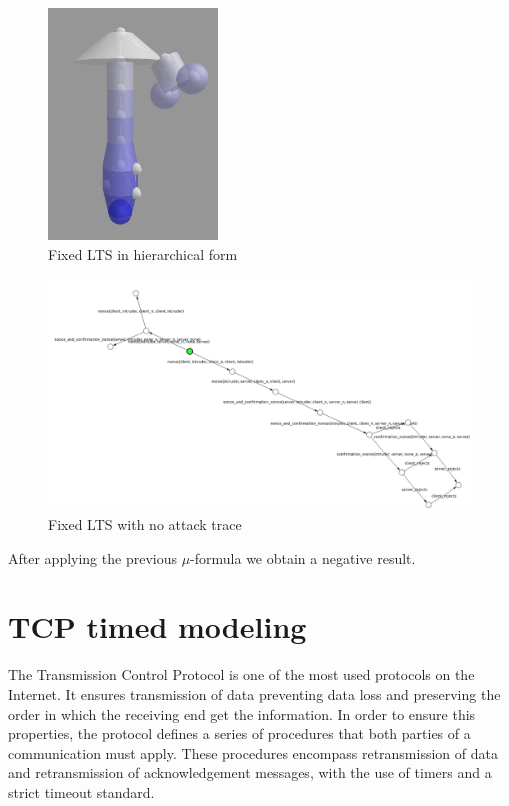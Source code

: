 \documentclass[11pt]{article}
\theoremstyle{definition}
\theoremstyle{plain}
\theoremstyle{definition}
\begin{document}
\begin{appendices}
\begin{figure}
\centering
\includegraphics[width=0.4\textwidth, keepaspectratio]{img/Needham-Schroeder/fixed-state-LTSview.png}
\caption{Fixed LTS in hierarchical form}\label{ltsNSFixedView}
\end{figure}
\begin{figure}
\centering
\includegraphics[width=\textwidth, keepaspectratio]{img/Needham-Schroeder/fixed-state-LTSgraph.png}
\caption{Fixed LTS with no attack trace}\label{ltsNSFixedGraph}
\end{figure}

After applying the previous $ \mu $-formula we obtain a negative result.

\section{TCP timed modeling}

The Transmission Control Protocol is one of the most used protocols on the Internet. It ensures transmission of data preventing data loss and preserving the order in which the receiving end get the information. In order to ensure this properties, the protocol defines a series of procedures that both parties of a communication must apply. These procedures encompass retransmission of data and retransmission of acknowledgement messages, with the use of timers and a strict timeout standard.


\end{appendices}
\end{document}
